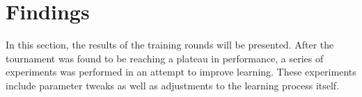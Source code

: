 \section{Findings}
\label{sec:findings}

In this section,
the results of the training rounds will be presented.
%
After the tournament was found to be reaching a plateau in performance,
a series of experiments was performed in an attempt to improve learning.
%
These experiments include parameter tweaks as well as adjustments to the
learning process itself.









